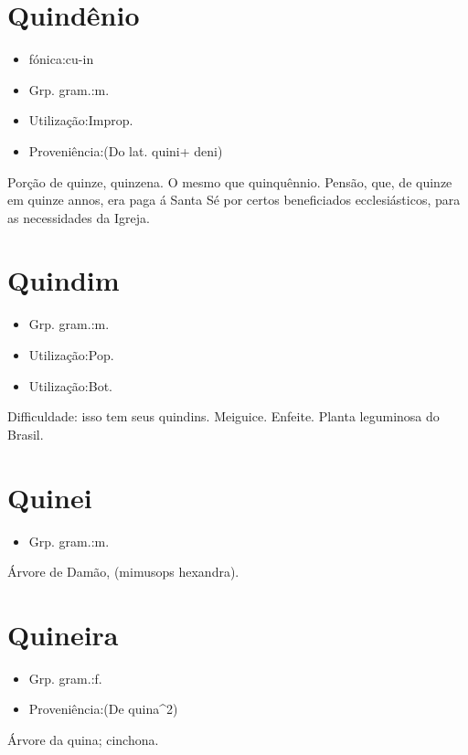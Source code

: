 \section{Quindênio}
\begin{itemize}
\item {fónica:cu-in}
\end{itemize}
\begin{itemize}
\item {Grp. gram.:m.}
\end{itemize}
\begin{itemize}
\item {Utilização:Improp.}
\end{itemize}
\begin{itemize}
\item {Proveniência:(Do lat. \textunderscore quini\textunderscore  + \textunderscore deni\textunderscore )}
\end{itemize}
Porção de quinze, quinzena.
O mesmo que \textunderscore quinquênnio\textunderscore .
Pensão, que, de quinze em quinze annos, era paga á Santa Sé por certos beneficiados ecclesiásticos, para as necessidades da Igreja.
\section{Quindim}
\begin{itemize}
\item {Grp. gram.:m.}
\end{itemize}
\begin{itemize}
\item {Utilização:Pop.}
\end{itemize}
\begin{itemize}
\item {Utilização:Bot.}
\end{itemize}
Difficuldade: \textunderscore isso tem seus quindins\textunderscore .
Meiguice.
Enfeite.
Planta leguminosa do Brasil.
\section{Quinei}
\begin{itemize}
\item {Grp. gram.:m.}
\end{itemize}
Árvore de Damão, (\textunderscore mimusops hexandra\textunderscore ).
\section{Quineira}
\begin{itemize}
\item {Grp. gram.:f.}
\end{itemize}
\begin{itemize}
\item {Proveniência:(De \textunderscore quina\textunderscore ^2)}
\end{itemize}
Árvore da quina; cinchona.
